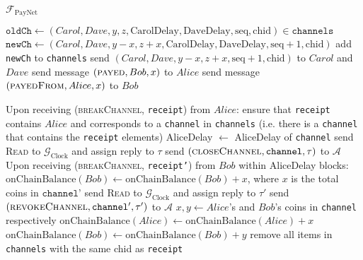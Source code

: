 \begin{functionality}{$\mathcal{F}_{\mathrm{PayNet}}$}
\begin{algorithmic}[1]
        \State $\mathtt{oldCh} \gets \left(Carol, Dave, y, z,
        \mathrm{CarolDelay}, \mathrm{DaveDelay}, \mathrm{seq},
        \mathrm{chid}\right) \in \mathtt{channels}$
        \State $\mathtt{newCh} \gets \left(Carol, Dave, y - x, z + x,
        \mathrm{CarolDelay}, \mathrm{DaveDelay}, \mathrm{seq} + 1,
        \mathrm{chid}\right)$
        \State add \texttt{newCh} to \texttt{channels}
        \State send $\left(Carol, Dave, y - x, z + x, \mathrm{seq} + 1,
        \mathrm{chid}\right)$ to $Carol$ and $Dave$ 
      \EndFor
      \State send message $\left(\textsc{payed}, Bob, x\right)$ to $Alice$
      \State send message $\left(\textsc{payedFrom}, Alice, x\right)$ to $Bob$
    \EndIndent
    \State

    \State Upon receiving (\textsc{breakChannel}, \texttt{receipt}) from $Alice$:
    \Indent
      \State ensure that \texttt{receipt} contains $Alice$ and corresponds to a
      \texttt{channel} in \texttt{channels} (i.e. there is a \texttt{channel}
      that contains the \texttt{receipt} elements)
      \State AliceDelay $\gets$ AliceDelay of \texttt{channel}
      \State send \textsc{Read} to $\mathcal{G}_{\mathrm{Clock}}$ and assign
      reply to $\tau$
      \State send $\left(\textsc{closeChannel}, \mathtt{channel},
      \tau\right)$ to $\mathcal{A}$
      \State Upon receiving (\textsc{breakChannel}, \texttt{receipt'}) from
      $Bob$ within AliceDelay blocks: 
        \State $\mathrm{onChainBalance}\left(Bob\right) \gets
        \mathrm{onChainBalance}\left(Bob\right) + x$, where $x$ is the total
        coins in $\texttt{channel'}$
        \State send \textsc{Read} to $\mathcal{G}_{\mathrm{Clock}}$ and assign
        reply to $\tau'$
        \State send $\left(\textsc{revokeChannel}, \mathtt{channel'},
        \tau'\right)$ to $\mathcal{A}$
      \Else
        \State $x, y \gets Alice$'s and $Bob$'s coins in \texttt{channel}
        respectively
        \State $\mathrm{onChainBalance}\left(Alice\right) \gets
        \mathrm{onChainBalance}\left(Alice\right) + x$
        \State $\mathrm{onChainBalance}\left(Bob\right) \gets
        \mathrm{onChainBalance}\left(Bob\right) + y$
      \EndIf
      \State remove all items in \texttt{channels} with the same chid as
      \texttt{receipt}
    \EndIndent
  \end{algorithmic}
\end{functionality}
